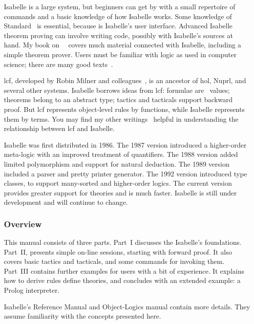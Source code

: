 Isabelle is a large system, but beginners can get by with a small
repertoire of commands and a basic knowledge of how Isabelle works.  Some
knowledge of Standard~\ML{} is essential, because \ML{} is Isabelle's user
interface.  Advanced Isabelle theorem proving can involve writing \ML{}
code, possibly with Isabelle's sources at hand.  My book
on~\ML{}~\cite{paulson91} covers much material connected with Isabelle,
including a simple theorem prover.  Users must be familiar with logic as
used in computer science; there are many good
texts~\cite{galton90,reeves90}.

{\sc lcf}, developed by Robin Milner and colleagues~\cite{mgordon79}, is an
ancestor of {\sc hol}, Nuprl, and several other systems.  Isabelle borrows
ideas from {\sc lcf}: formulae are~\ML{} values; theorems belong to an
abstract type; tactics and tacticals support backward proof.  But {\sc lcf}
represents object-level rules by functions, while Isabelle represents them
by terms.  You may find my other writings~\cite{paulson87,paulson-handbook}
helpful in understanding the relationship between {\sc lcf} and Isabelle.

 Isabelle was first distributed in 1986.
The 1987 version introduced a higher-order meta-logic with an improved
treatment of quantifiers.  The 1988 version added limited polymorphism and
support for natural deduction.  The 1989 version included a parser and
pretty printer generator.  The 1992 version introduced type classes, to
support many-sorted and higher-order logics.  The current version provides
greater support for theories and is much faster.  Isabelle is still under
development and will continue to change.

\subsubsection*{Overview} 
This manual consists of three parts.  Part~I discusses the Isabelle's
foundations.  Part~II, presents simple on-line sessions, starting with
forward proof.  It also covers basic tactics and tacticals, and some
commands for invoking them.  Part~III contains further examples for users
with a bit of experience.  It explains how to derive rules define theories,
and concludes with an extended example: a Prolog interpreter.

Isabelle's Reference Manual and Object-Logics manual contain more details.
They assume familiarity with the concepts presented here.


